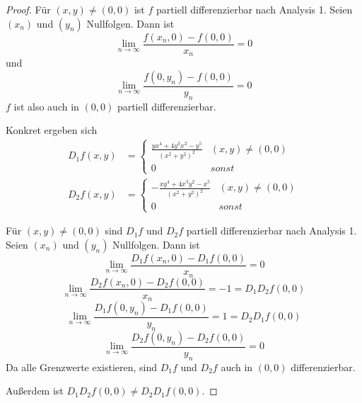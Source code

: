 \documentclass[10pt,a4paper]{article}
\begin{document}
\begin{proof}
Für $(x, y) \ne (0, 0)$ ist $f$ partiell differenzierbar nach Analysis 1.
Seien $(x_{n})$ und $(y_{n})$ Nullfolgen.
Dann ist 
\begin{equation}
\lim_{n \rightarrow \infty} \frac{f(x_{n}, 0) - f(0, 0)}{x_{n}} = 0
\end{equation}
und \begin{equation}
\lim_{n \rightarrow \infty} \frac{f(0, y_{n}) - f(0, 0)}{y_{n}} = 0
\end{equation}
$f$ ist also auch in $(0, 0)$ partiell differenzierbar.

Konkret ergeben sich
\begin{align}
D_{1}f(x, y) & =
\begin{cases}
\frac{yx^{4} + 4y^{3}x^{2} - y^{5}}{(x^{2} + y^{2})^{2}} & \textit{$(x, y) \ne (0, 0)$}\\
0 & \textit{sonst}
\end{cases}\\
D_{2}f(x, y) & = 
\begin{cases}
-\frac{xy^{4} + 4x^{3}y^{2} - x^{5}}{(x^{2} + y^{2})^{2}} & \textit{$(x, y) \ne (0, 0)$}\\
0 & \textit{sonst}
\end{cases}
\end{align}

Für $(x, y) \ne (0, 0)$ sind $D_{1}f$ und $D_{2}f$ partiell differenzierbar nach Analysis 1.
Seien $(x_{n})$ und $(y_{n})$ Nullfolgen.
Dann ist
\begin{equation}
\lim_{n \rightarrow \infty} \frac{D_{1}f(x_{n}, 0) - D_{1}f(0, 0)}{x_{n}} = 0
\end{equation}
\begin{equation}
\lim_{n \rightarrow \infty} \frac{D_{2}f(x_{n}, 0) - D_{2}f(0, 0)}{x_{n}} = -1 = D_{1}D_{2}f(0, 0)
\end{equation}
\begin{equation}
\lim_{n \rightarrow \infty} \frac{D_{1}f(0, y_{n}) - D_{1}f(0, 0)}{y_{n}} = 1 = D_{2}D_{1}f(0, 0)
\end{equation}
\begin{equation}
\lim_{n \rightarrow \infty} \frac{D_{2}f(0, y_{n}) - D_{2}f(0, 0)}{y_{n}} = 0
\end{equation}
Da alle Grenzwerte existieren, sind $D_{1}f$ und $D_{2}f$ auch in $(0, 0)$ differenzierbar.

Außerdem ist $D_{1}D_{2}f(0, 0) \ne D_{2}D_{1}f(0, 0)$.
\end{proof}
\end{document}
